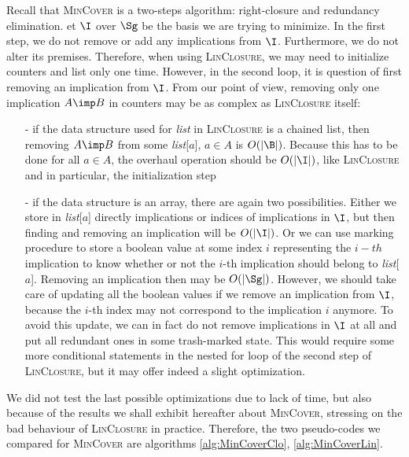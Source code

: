 Recall that \textsc{MinCover} is a two-steps algorithm: right-closure and redundancy elimination. et $\I$ over $\Sg$ be the basis we are trying to minimize. In the first step, we do not remove or add any implications from
$\I$. Furthermore, we do not alter its premises. Therefore, when using
\textsc{LinClosure}, we may need to initialize counters and list only one
time. However, in the second loop, it is question of first removing an implication from $\I$. From our point of view, removing only one implication
$A \imp B$ in counters may be as complex as \textsc{LinClosure} itself:
\begin{itemize}
	\item[-] if the data structure used for \textit{list} in \textsc{LinClosure}
	is a chained list, then removing $A \imp B$ from some \textit{list}[$a$], $a \in A$ is $O(|\B|)$. Because this has to be done for all $a \in A$, the 
	overhaul operation should be $O(|\I|)$, like \textsc{LinClosure} and in particular, the initialization step
	\item[-] if the data structure is an array, there are again two possibilities. Either we store in \textit{list}[$a$] directly implications or indices of implications in $\I$, but then finding and removing an implication will be $O(|\I|)$. Or we can use marking procedure to store a boolean value at some index $i$ representing the $i-th$ implication to know
	whether or not the $i$-th implication should belong to \textit{list}[$a$]. Removing an implication then may be $O(|\Sg|)$. However, we should take care
	of updating all the boolean values  if we remove an implication from $\I$, because the $i$-th index may not correspond to the implication $i$ anymore. To avoid this update, we can in fact do not remove implications in $\I$ at
	all and put all redundant ones in some trash-marked state. This would require some more conditional statements in the nested for loop of the second step of \textsc{LinClosure}, but it may offer indeed a slight optimization.
\end{itemize}
\noindent We did not test the last possible optimizations due to lack of time,
but also because of the results we shall exhibit hereafter about \textsc{MinCover}, stressing on the bad behaviour of \textsc{LinClosure} in practice. Therefore, the two pseudo-codes we compared for \textsc{MinCover} are
algorithms \ref{alg:MinCoverClo}, \ref{alg:MinCoverLin}.

\vspace{1.2em}

